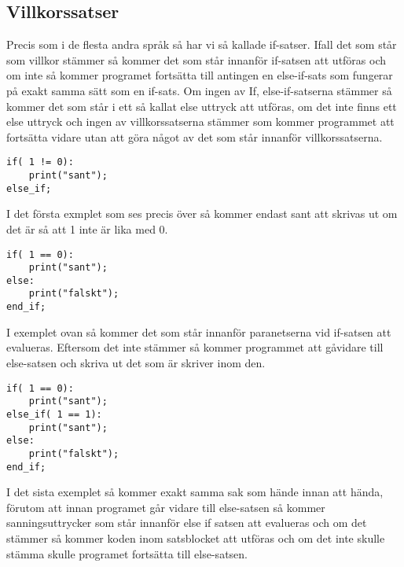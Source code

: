 \documentclass[12pt]{TDP019}
\begin{document}
\subsection{Villkorssatser}
Precis som i de flesta andra språk så har vi så kallade if-satser. Ifall det som står som villkor stämmer så kommer det som står innanför if-satsen att utföras och om inte så kommer programet fortsätta till antingen en else-if-sats som fungerar på exakt samma sätt som en if-sats. Om ingen av If, else-if-satserna  stämmer så kommer det som står i ett så kallat else uttryck att utföras, om det inte finns ett else uttryck och ingen av villkorssatserna stämmer som kommer programmet att fortsätta vidare utan att göra något av det som står innanför villkorssatserna.
\begin{verbatim}
if( 1 != 0):
    print("sant");
else_if;
\end{verbatim}
I det första exmplet som ses precis över så kommer endast sant att skrivas ut om det är så att 1 inte är lika med 0.
\begin{verbatim}
if( 1 == 0):
    print("sant");
else:
    print("falskt");
end_if;
\end{verbatim}
I exemplet ovan så kommer det som står innanför paranetserna vid if-satsen att evalueras. Eftersom det inte stämmer så kommer programmet att gåvidare till else-satsen och skriva ut det som är skriver inom den.
\begin{verbatim}
if( 1 == 0):
    print("sant");
else_if( 1 == 1):
    print("sant");
else:
    print("falskt");
end_if;
\end{verbatim}
I det sista exemplet så kommer exakt samma sak som hände innan att hända, förutom att innan programet går vidare till else-satsen så kommer sanningsuttrycker som står innanför else if satsen att evalueras och om det stämmer så kommer koden inom satsblocket att utföras och om det inte skulle stämma skulle programet fortsätta till else-satsen.
\end{document}
